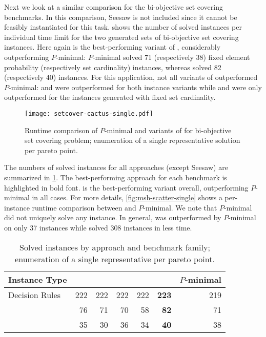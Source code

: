 Next we look at a similar comparison for the bi-objective set covering benchmarks.
In this comparison, Seesaw is not included since it cannot be feasibly instantiated for this task.
 shows the number of solved instances per individual time limit for the two generated sets of bi-objective set covering instances.
Here again \msh{} is the best-performing variant of \algname{}, considerably outperforming $P$-minimal:
$P$-minimal solved 71 (respectively 38) fixed element probability (respectively set cardinality) instances, whereas \msh{} solved 82 (respectively 40) instances.
For this application, not all variants of \algname{} outperformed $P$-minimal:
\msu{} and \oll{} were outperformed for both instance variants while \satunsat{} and \unsatsat{} were only outperformed for the instances generated with fixed set cardinality.

\begin{figure}
    \centering
    \texttt{[image: setcover-cactus-single.pdf]}
    \caption{Runtime comparison of $P$-minimal and variants of \algname{} for bi-objective set covering problem;
      enumeration of a single representative solution per pareto point.
    }\label{fig:setcover-cactus-single}
\end{figure}

The numbers of solved instances for all approaches (except Seesaw) are summarized in \cref{tab:nsolved-single}.
The best-performing approach for each benchmark is highlighted in bold font.
\msh{} is the best-performing \algname{} variant overall, outperforming $P$-minimal in all cases.
For more details, \cref{fig:msh-scatter-single} shows a per-instance runtime comparison between \msh{} and $P$-minimal.
We note that $P$-minimal did not uniquely solve any instance.
In general, \msh{} was outperformed by $P$-minimal on only 37 instances while \msh{} solved 308 instances in less time.

\begin{table}
  \centering
  \caption{Solved instances by approach and benchmark family;
    enumeration of a single representative per pareto point.
  }\label{tab:nsolved-single}
  \begin{tabular}{@{}lrrrrrr@{}}
    \toprule
    Instance Type & \satunsat{} & \unsatsat{} & \msu{} & \oll{} & \msh{} & $P$-minimal \\
    \midrule
    Decision Rules & 222 & 222 & 222 & 222 & \textbf{223} & 219 \\
    \scep{} & 76 & 71 & 70 & 58 & \textbf{82} & 71 \\
    \scsc{} & 35 & 30 & 36 & 34 & \textbf{40} & 38 \\
    \bottomrule
  \end{tabular}
\end{table}

